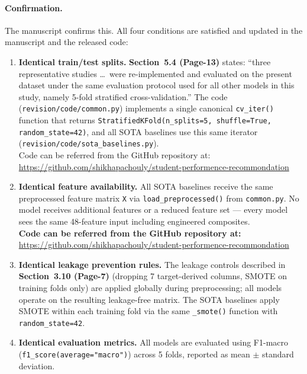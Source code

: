 \documentclass[11pt,a4paper]{article}
\newcommand{\filebox}[1]{\texttt{\small #1}}
\newcommand{\sectref}[1]{Section~#1}
\newcommand{\stress}[1]{\textbf{#1}}
\begin{document}
\paragraph{Confirmation.} The manuscript  confirms this. All four conditions are satisfied and updated in the manuscript and the released code:

\begin{enumerate}
  \item \stress{Identical train/test splits.} \stress{\sectref{5.4 (Page-13)}} states: ``three representative studies  \ldots\ were re-implemented and evaluated on the present dataset under the same evaluation protocol used for all other models in this study, namely 5-fold stratified cross-validation.'' The code (\filebox{revision/code/common.py}) implements a single canonical \texttt{cv\_iter()} function that returns \texttt{StratifiedKFold(n\_splits=5, shuffle=True, random\_state=42)}, and all SOTA baselines use this same iterator (\filebox{revision/code/sota\_baselines.py}).\\
  Code can be referred from the GitHub repository at: \\ \url{https://github.com/shikhapachouly/student-performence-recommondation}

  \item \stress{Identical feature availability.} All SOTA baselines receive the same preprocessed feature matrix \texttt{X} via \texttt{load\_preprocessed()} from \filebox{common.py}. No model receives additional features or a reduced feature set --- every model sees the same 48-feature input including engineered composites.\\
  \stress{Code can be referred from the GitHub repository at:} \\ \url{https://github.com/shikhapachouly/student-performence-recommondation}

  \item \stress{Identical leakage prevention rules.} The leakage controls described in \stress{\sectref{3.10 (Page-7)}} (dropping 7 target-derived columns, SMOTE on training folds only) are applied globally during preprocessing; all models operate on the resulting leakage-free matrix. The SOTA baselines apply SMOTE within each training fold via the same \texttt{\_smote()} function with \texttt{random\_state=42}.

  \item \stress{Identical evaluation metrics.} All models are evaluated using F1-macro (\texttt{f1\_score(average="macro")}) across 5 folds, reported as mean $\pm$ standard deviation.
\end{enumerate}
\end{document}
